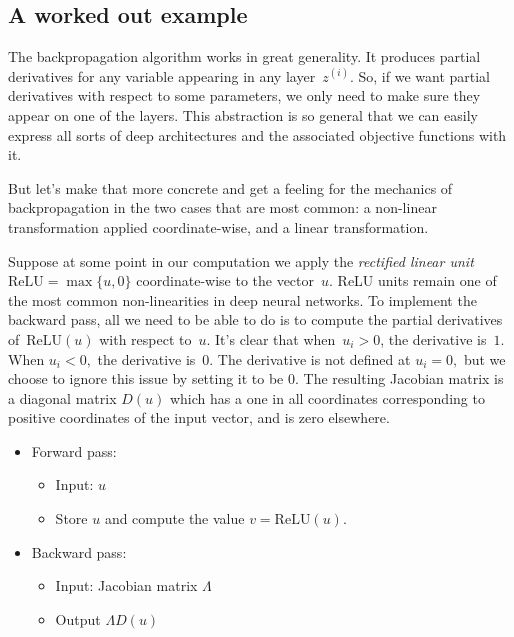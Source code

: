 \documentclass{tufte-book}
\begin{document}
\hypertarget{a-worked-out-example}{%
\subsection{A worked out example}\label{a-worked-out-example}}

The backpropagation algorithm works in great generality. It produces
partial derivatives for any variable appearing in any layer~\(z^{(i)}\).
So, if we want partial derivatives with respect to some parameters, we
only need to make sure they appear on one of the layers. This
abstraction is so general that we can easily express all sorts of deep
architectures and the associated objective functions with it.

But let's make that more concrete and get a feeling for the mechanics of
backpropagation in the two cases that are most common: a non-linear
transformation applied coordinate-wise, and a linear transformation.

Suppose at some point in our computation we apply the \emph{rectified
linear unit} \(\mathrm{ReLU}=\max\{u, 0\}\) coordinate-wise to the
vector~\(u\). ReLU units remain one of the most common non-linearities
in deep neural networks. To implement the backward pass, all we need to
be able to do is to compute the partial derivatives
of~\(\mathrm{ReLU}(u)\) with respect to~\(u\). It's clear that
when~\(u_i > 0\), the derivative is~\(1\). When \(u_i < 0,\) the
derivative is~\(0\). The derivative is not defined at \(u_i=0,\) but we
choose to ignore this issue by setting it to be \(0\). The resulting Jacobian matrix is a diagonal matrix
\(D(u)\) which has a one in all coordinates corresponding to positive
coordinates of the input vector, and is zero elsewhere.

\begin{itemize}
\tightlist
\item
  Forward pass:

  \begin{itemize}
  \tightlist
  \item
    Input: \(u\)
  \item
    Store \(u\) and compute the value \(v=\mathrm{ReLU}(u)\).
  \end{itemize}
\item
  Backward pass:

  \begin{itemize}
  \tightlist
  \item
    Input: Jacobian matrix \(\Lambda\)
  \item
    Output \(\Lambda D(u)\)
  \end{itemize}
\end{itemize}
\end{document}

